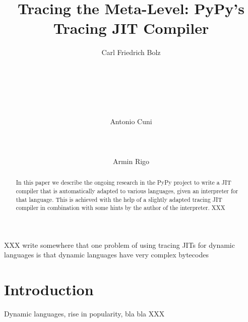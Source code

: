 \documentclass{acm_proc_article-sp}
\begin{document}
\title{Tracing the Meta-Level: PyPy's Tracing JIT Compiler}

\author{
\alignauthor Carl Friedrich Bolz\\
       \\
       \\
       \\ 
       \\
       \\
       \\
\alignauthor Antonio Cuni\\
       \\
       \\
       \\
\alignauthor Armin Rigo\\
}
\maketitle



\begin{abstract}
In this paper we describe the ongoing research in the PyPy project to write a
JIT compiler that is automatically adapted to various languages, given an
interpreter for that language. This is achieved with the help of a slightly
adapted tracing JIT compiler in combination with some hints by the author of the
interpreter.  XXX

\end{abstract}

XXX write somewhere that one problem of using tracing JITs for dynamic languages
is that dynamic languages have very complex bytecodes


\section{Introduction}

Dynamic languages, rise in popularity, bla bla XXX
\end{document}
